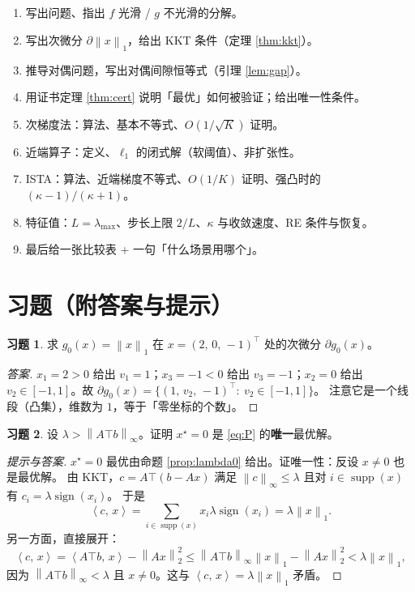 \documentclass[11pt,a4paper,UTF8]{ctexart}
\theoremstyle{plain}
\theoremstyle{definition}
\newtheorem{exercise}{习题}[section]
\theoremstyle{remark}
\newcommand{\norm}[1]{\left\lVert #1 \right\rVert}
\newcommand{\inner}[2]{\left\langle #1,\, #2 \right\rangle}
\newcommand{\supp}{\operatorname{supp}}
\DeclareMathOperator{\sign}{sign}
\newcommand{\tp}{^{\top}}
\begin{document}
\begin{enumerate}
\item 写出问题、指出 $f$ 光滑 / $g$ 不光滑的分解。
\item 写出次微分 $\partial\norm{x}_1$，给出 KKT 条件（定理 \ref{thm:kkt}）。
\item 推导对偶问题，写出对偶间隙恒等式（引理 \ref{lem:gap}）。
\item 用证书定理 \ref{thm:cert} 说明「最优」如何被验证；给出唯一性条件。
\item 次梯度法：算法、基本不等式、$O(1/\sqrt K)$ 证明。
\item 近端算子：定义、$\ell_1$ 的闭式解（软阈值）、非扩张性。
\item ISTA：算法、近端梯度不等式、$O(1/K)$ 证明、强凸时的 $(\kappa-1)/(\kappa+1)$。
\item 特征值：$L=\lambda_{\max}$、步长上限 $2/L$、$\kappa$ 与收敛速度、RE 条件与恢复。
\item 最后给一张比较表 + 一句「什么场景用哪个」。
\end{enumerate}

\section{习题（附答案与提示）}

\begin{exercise}\label{exe:subdiff}
求 $g_0(x)=\norm x_1$ 在 $x=(2,\,0,\,-1)\tp$ 处的次微分 $\partial g_0(x)$。
\end{exercise}

\begin{proof}[答案]
$x_1=2>0$ 给出 $v_1=1$；$x_3=-1<0$ 给出 $v_3=-1$；$x_2=0$ 给出 $v_2\in[-1,1]$。故
$\partial g_0(x)=\{(1,\,v_2,\,-1)\tp:\ v_2\in[-1,1]\}$。
注意它是一个线段（凸集），维数为 $1$，等于「零坐标的个数」。
\end{proof}

\begin{exercise}\label{exe:lambda}
设 $\lambda>\norm{A\top b}_\infty$。证明 $x^\star=0$ 是 \eqref{eq:P} 的\textbf{唯一}最优解。
\end{exercise}

\begin{proof}[提示与答案]
$x^\star=0$ 最优由命题 \ref{prop:lambda0} 给出。证唯一性：反设 $x\neq0$ 也是最优解。
由 KKT，$c=A\top(b-Ax)$ 满足 $\norm c_\infty\le\lambda$ 且对 $i\in\supp(x)$ 有 $c_i=\lambda\sign(x_i)$。
于是
\[
\inner cx=\sum_{i\in\supp(x)}x_i\lambda\sign(x_i)=\lambda\norm x_1 .
\]
另一方面，直接展开：
\[
\inner cx=\inner{A\top b}{x}-\norm{Ax}_2^2\le\norm{A\top b}_\infty\norm x_1-\norm{Ax}_2^2<\lambda\norm x_1 ,
\]
因为 $\norm{A\top b}_\infty<\lambda$ 且 $x\neq0$。这与 $\inner cx=\lambda\norm x_1$ 矛盾。
\end{proof}
\end{document}
